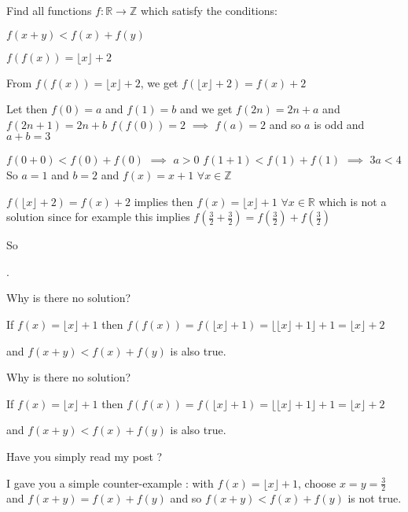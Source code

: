 \begin{solution}
	\begin{tcolorbox}Find all functions $f : \mathbb{R} \to \mathbb{Z}$ which satisfy the conditions: 

$f(x+y) < f(x) + f(y)$

$f(f(x)) = \lfloor {x} \rfloor + 2$\end{tcolorbox}
From $f(f(x))=\lfloor x\rfloor+2$, we get $f(\lfloor x\rfloor+2)=f(x)+2$

Let then $f(0)=a$ and $f(1)=b$ and we get $f(2n)=2n+a$ and $f(2n+1)=2n+b$
$f(f(0))=2$ $\implies$ $f(a)=2$ and so $a$ is odd and $a+b=3$

$f(0+0)<f(0)+f(0)$ $\implies$ $a>0$
$f(1+1)<f(1)+f(1)$ $\implies$ $3a<4$
So $a=1$ and $b=2$ and $f(x)=x+1$ $\forall x\in\mathbb Z$

$f(\lfloor x\rfloor+2)=f(x)+2$ implies then $f(x)=\lfloor x\rfloor+1$ $\forall x\in\mathbb R$ which is not a solution since for example this implies $f(\frac 32+\frac 32)=f(\frac 32)+f(\frac 32)$

So .
\end{solution}



\begin{solution}
	Why is there no solution?

If $f(x) = \lfloor x \rfloor +1$ then $f(f(x)) = f( \lfloor x \rfloor +1 ) = \lfloor  \lfloor x \rfloor +1 \rfloor + 1 = \lfloor x \rfloor + 2$

and $f(x+y) < f(x) + f(y)$ is also true.
\end{solution}



\begin{solution}
	\begin{tcolorbox}Why is there no solution?

If $f(x) = \lfloor x \rfloor +1$ then $f(f(x)) = f( \lfloor x \rfloor +1 ) = \lfloor  \lfloor x \rfloor +1 \rfloor + 1 = \lfloor x \rfloor + 2$

and $f(x+y) < f(x) + f(y)$ is also true.\end{tcolorbox}
Have you simply read my post ?

I gave you a simple counter-example : with $f(x)=\lfloor x\rfloor +1$, choose $x=y=\frac 32$ and $f(x+y)=f(x)+f(y)$ and so $f(x+y)<f(x)+f(y)$ is not true.
\end{solution}



